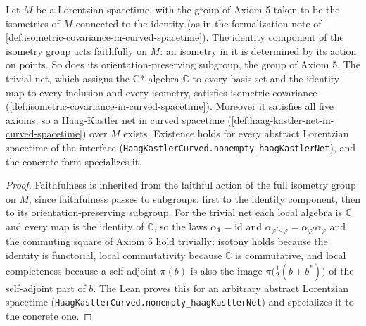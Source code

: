 \begin{theorem}
    \label{thrm:haag-kastler-net-in-curved-spacetime-nonempty}
    \leanok
    Let $M$ be a Lorentzian spacetime, with the group of Axiom 5 taken to be the isometries of $M$ connected to the identity (as in the formalization note of \ref{def:isometric-covariance-in-curved-spacetime}). The identity component of the isometry group acts faithfully on $M$: an isometry in it is determined by its action on points. So does its orientation-preserving subgroup, the group of Axiom 5. The trivial net, which assigns the C*-algebra $\mathbb{C}$ to every basis set and the identity map to every inclusion and every isometry, satisfies isometric covariance (\ref{def:isometric-covariance-in-curved-spacetime}). Moreover it satisfies all five axioms, so a Haag-Kastler net in curved spacetime (\ref{def:haag-kastler-net-in-curved-spacetime}) over $M$ exists. Existence holds for every abstract Lorentzian spacetime of the interface (\texttt{HaagKastlerCurved.nonempty\_haagKastlerNet}), and the concrete form specializes it.
\end{theorem}
\begin{proof}
    \leanok
    Faithfulness is inherited from the faithful action of the full isometry group on $M$, since faithfulness passes to subgroups: first to the identity component, then to its orientation-preserving subgroup. For the trivial net each local algebra is $\mathbb{C}$ and every map is the identity of $\mathbb{C}$, so the laws $\alpha_{\mathbf{1}} = \mathrm{id}$ and $\alpha_{\varphi'\circ\varphi} = \alpha_{\varphi'}\alpha_\varphi$ and the commuting square of Axiom 5 hold trivially; isotony holds because the identity is functorial, local commutativity because $\mathbb{C}$ is commutative, and local completeness because a self-adjoint $\pi(b)$ is also the image $\pi\big(\tfrac12(b + b^*)\big)$ of the self-adjoint part of $b$. The Lean proves this for an arbitrary abstract Lorentzian spacetime (\texttt{HaagKastlerCurved.nonempty\_haagKastlerNet}) and specializes it to the concrete one.
\end{proof}

